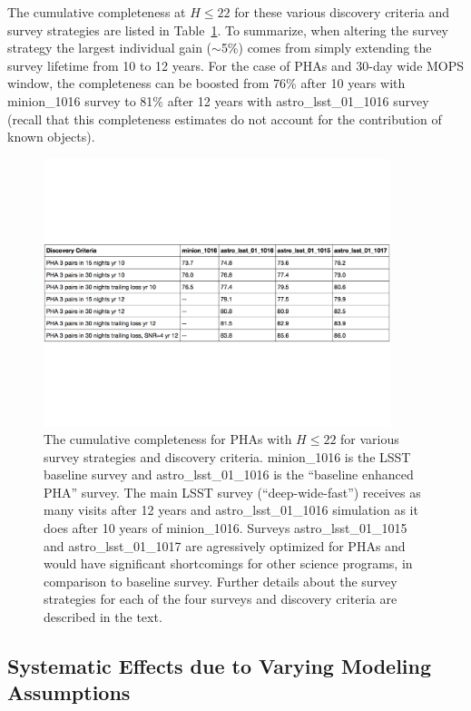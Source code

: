 The cumulative completeness at $H\le22$ for these various discovery criteria and survey strategies are listed in Table~\ref{tab:completeness}. To summarize, when altering the survey strategy the largest individual gain ($\sim$5\%) 
comes from simply extending the survey lifetime from 10 to 12 years. For the case of PHAs and 30-day wide MOPS window,
the completeness can be boosted from 76\% after 10 years with minion\_1016 survey to 81\% after 12 years with 
astro\_lsst\_01\_1016 survey (recall that this completeness estimates do not account for the contribution of known objects). 


\begin{figure}[t!]
\centering
\includegraphics[width=0.90\textwidth]{figures/PHA_cumulative_completeness}
\caption{The cumulative completeness for PHAs with $H\le22$ for various survey strategies and discovery criteria. 
minion\_1016 is the LSST baseline survey and astro\_lsst\_01\_1016 is the ``baseline enhanced PHA'' survey.
The main LSST survey (``deep-wide-fast'') receives as many visits after 12 years and astro\_lsst\_01\_1016 simulation
as it does after 10 years of minion\_1016. Surveys astro\_lsst\_01\_1015 and astro\_lsst\_01\_1017 are agressively 
optimized for PHAs and would have significant shortcomings for other science programs, in comparison to baseline survey. 
Further details about the survey strategies for each of the four surveys and discovery criteria are described in the text.
\label{tab:completeness}}
\end{figure}



\subsection{Systematic Effects due to Varying Modeling Assumptions \label{sec:syseff}}

